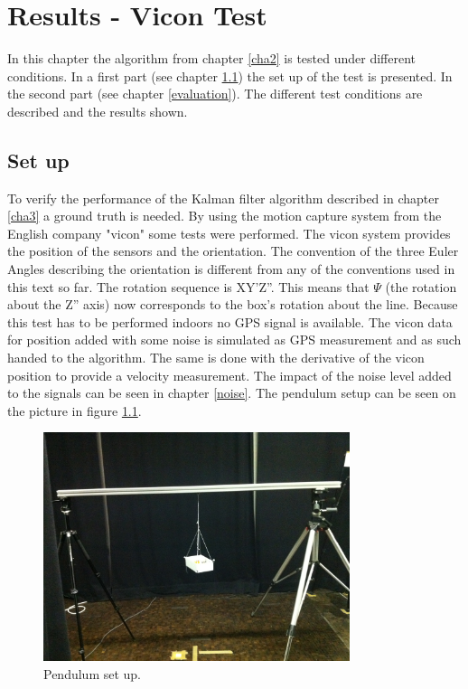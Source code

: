 \chapter{Results - Vicon Test}\label{cha4}
In this chapter the algorithm from chapter \ref{cha2} is tested under different conditions. In a first part (see chapter \ref{setup}) the set up of the test is presented. In the second part (see chapter \ref{evaluation}). The different test conditions are described and the results shown.
\section{Set up}\label{setup}
To verify the performance of the Kalman filter algorithm described in chapter \ref{cha3} a ground truth is needed.  By using the motion capture system from the English company "vicon" some tests were performed. The vicon system provides the position of the sensors and the orientation. The convention of the three Euler Angles describing the orientation is different from any of the conventions used in this text so far. The rotation sequence is XY'Z''. This means that $\Psi$ (the rotation about the Z'' axis) now corresponds to the box's rotation about the line. Because this test has to be performed indoors no GPS signal is available. The vicon data for position added with some noise is simulated as GPS measurement and as such handed to the algorithm. The same is done with the derivative of the vicon position to provide a velocity measurement. The impact of the noise level added to the signals can be seen in chapter \ref{noise}.
The pendulum setup can be seen on the picture in figure \ref{pend_setup}. 
\begin{figure}[h]
\centering
\includegraphics[width=0.8\textwidth]{vicon_bilder/IMG_0137.JPG}
\caption{Pendulum set up.}
\label{pend_setup}
\end{figure}
